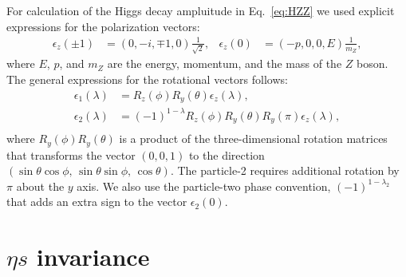 \documentclass[prd,preprintnumbers,floatfix,
nofootinbib,superscriptaddress]{revtex4}
\begin{document}
For calculation of the Higgs decay ampluitude in Eq.~\eqref{eq:HZZ}
we used explicit expressions for the polarization vectors:
\begin{align}
  \epsilon_z(\pm1) &= (0,-i,\mp 1,0)\frac{1}{\sqrt{2}}, &
  \epsilon_z(0) &= (-p,0,0,E)\frac{1}{m_Z},
\end{align}
where $E$, $p$, and $m_Z$ are the energy, momentum, and the mass of the $Z$ boson.
The general expressions for the rotational vectors follows:
\begin{align}
  \epsilon_1(\lambda) &= R_z(\phi) R_y(\theta) \epsilon_z(\lambda),\\
  \epsilon_2(\lambda) &= (-1)^{1-\lambda} R_z(\phi) R_y(\theta) R_y(\pi) \epsilon_z(\lambda),\\
\end{align}
where $R_y(\phi)R_y(\theta)$ is a product of the three-dimensional rotation matrices
that transforms the vector $(0,0,1)$ to the direction $(\sin\theta\cos\phi,\,\sin\theta\sin\phi,\,\cos\theta)$.
The particle-2 requires additional rotation by $\pi$ about the $y$ axis. We also use the particle-two phase convention,
$(-1)^{1-\lambda_2}$ that adds an extra sign to the vector $\epsilon_2(0)$.

\section{$\eta s$ invariance}
\end{document}
